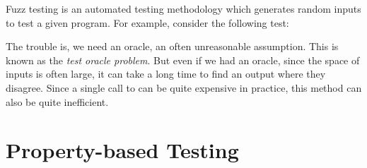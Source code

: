 Fuzz testing is an automated testing methodology which generates random inputs to test a given program. For example, consider the following test:
%
%
The trouble is, we need an oracle, an often unreasonable assumption. This is known as the \textit{test oracle problem}. But even if we had an oracle, since the space of inputs is often large, it can take a long time to find an output where they disagree. Since a single call to  can be quite expensive in practice, this method can also be quite inefficient.

\section{Property-based Testing}\label{subsec:property-based-testing}

